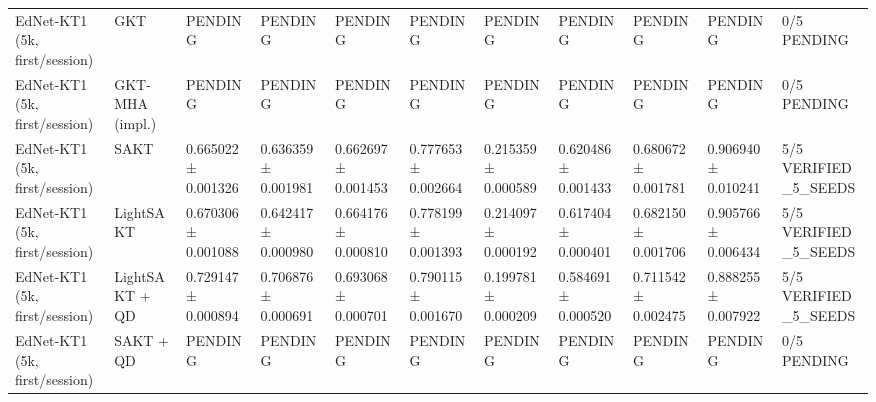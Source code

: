 \begin{longtable}{lllllllllll}
EdNet-KT1 (5k, first/session) & GKT & PENDING & PENDING & PENDING & PENDING & PENDING & PENDING & PENDING & PENDING & 0/5 PENDING \\
EdNet-KT1 (5k, first/session) & GKT-MHA (impl.) & PENDING & PENDING & PENDING & PENDING & PENDING & PENDING & PENDING & PENDING & 0/5 PENDING \\
EdNet-KT1 (5k, first/session) & SAKT & 0.665022 ± 0.001326 & 0.636359 ± 0.001981 & 0.662697 ± 0.001453 & 0.777653 ± 0.002664 & 0.215359 ± 0.000589 & 0.620486 ± 0.001433 & 0.680672 ± 0.001781 & 0.906940 ± 0.010241 & 5/5 VERIFIED\_5\_SEEDS \\
EdNet-KT1 (5k, first/session) & LightSAKT & 0.670306 ± 0.001088 & 0.642417 ± 0.000980 & 0.664176 ± 0.000810 & 0.778199 ± 0.001393 & 0.214097 ± 0.000192 & 0.617404 ± 0.000401 & 0.682150 ± 0.001706 & 0.905766 ± 0.006434 & 5/5 VERIFIED\_5\_SEEDS \\
EdNet-KT1 (5k, first/session) & LightSAKT + QD & 0.729147 ± 0.000894 & 0.706876 ± 0.000691 & 0.693068 ± 0.000701 & 0.790115 ± 0.001670 & 0.199781 ± 0.000209 & 0.584691 ± 0.000520 & 0.711542 ± 0.002475 & 0.888255 ± 0.007922 & 5/5 VERIFIED\_5\_SEEDS \\
EdNet-KT1 (5k, first/session) & SAKT + QD & PENDING & PENDING & PENDING & PENDING & PENDING & PENDING & PENDING & PENDING & 0/5 PENDING \\
\end{longtable}
